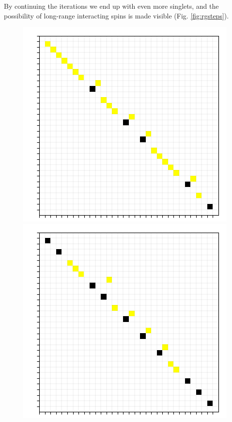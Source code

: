 \documentclass[../numerical,,../../main.tex]{subfiles}
\begin{document}
By continuing the iterations we end up with even more singlets, and the possibility of long-range interacting spins is made visible (Fig. \ref{fig:rgsteps}).
\begin{figure}[H]
\centering
    \begin{minipage}[]{.3\textwidth}
    \includegraphics[width=\textwidth]{Chapter5/Figures/RG/midrg5.png}
    \end{minipage}
    \begin{minipage}[]{.3\textwidth}
    \includegraphics[width=\textwidth]{Chapter5/Figures/RG/midrg10.png}
    \end{minipage}
    

\end{figure}
\end{document}

